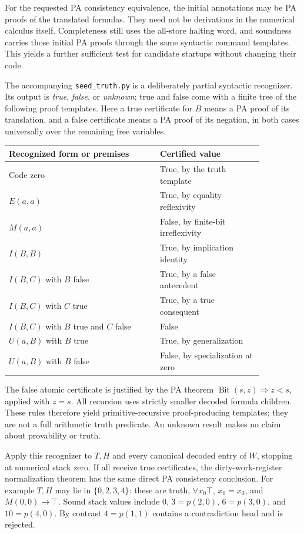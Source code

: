 \documentclass[11pt]{article}
\begin{document}
For the requested PA consistency equivalence, the initial annotations may
be PA proofs of the translated formulas. They need not be derivations in
the numerical calculus itself. Completeness still uses the all-store
halting word, and soundness carries those initial PA proofs through the
same syntactic command templates. This yields a further sufficient test
for candidate startups without changing their code.

The accompanying \texttt{seed\_truth.py} is a deliberately partial
syntactic recognizer. Its output is \emph{true}, \emph{false}, or
\emph{unknown}; true and false come with a finite tree of the following
proof templates. Here a true certificate for $B$ means a PA proof of its
translation, and a false certificate means a PA proof of its negation,
in both cases universally over the remaining free variables.
\begin{center}\small
\begin{tabular}{p{0.51\linewidth}p{0.35\linewidth}}
\toprule
Recognized form or premises&Certified value\\
\midrule
Code zero&True, by the truth template\\
$E(a,a)$&True, by equality reflexivity\\
$M(a,a)$&False, by finite-bit irreflexivity\\
$I(B,B)$&True, by implication identity\\
$I(B,C)$ with $B$ false&True, by a false antecedent\\
$I(B,C)$ with $C$ true&True, by a true consequent\\
$I(B,C)$ with $B$ true and $C$ false&False\\
$U(a,B)$ with $B$ true&True, by generalization\\
$U(a,B)$ with $B$ false&False, by specialization at zero\\
\bottomrule
\end{tabular}
\end{center}
The false atomic certificate is justified by the PA theorem
$\operatorname{Bit}(s,z)\Rightarrow z<s$, applied with $z=s$.
All recursion uses strictly smaller decoded formula children. These
rules therefore yield primitive-recursive proof-producing templates;
they are not a full arithmetic truth predicate. An unknown result makes
no claim about provability or truth.

Apply this recognizer to $T,H$ and every canonical decoded entry of
$W$, stopping at numerical stack zero. If all receive true certificates,
the dirty-work-register normalization theorem has the same direct PA
consistency conclusion. For example $T,H$ may lie in $\{0,2,3,4\}$:
these are truth, $\forall x_0\top$, $x_0=x_0$, and
$M(0,0)\to\top$. Sound stack values include $0$, $3=p(2,0)$,
$6=p(3,0)$, and $10=p(4,0)$. By contrast $4=p(1,1)$ contains a
contradiction head and is rejected.
\end{document}
